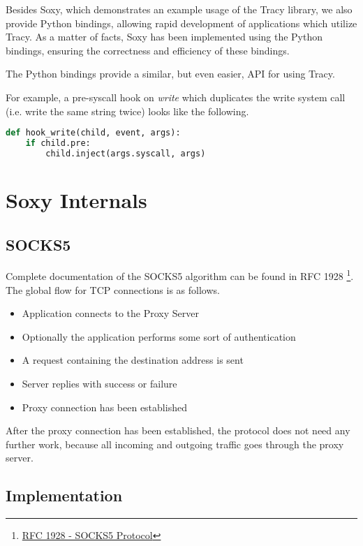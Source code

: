 \documentclass[a4paper, 10pt]{report}
\begin{document}
Besides Soxy, which demonstrates an example usage of the Tracy library, we
also provide Python bindings, allowing rapid development of applications
which utilize Tracy. As a matter of facts, Soxy has been implemented using the
Python bindings, ensuring the correctness and efficiency of these bindings.

The Python bindings provide a similar, but even easier, API for using Tracy.

For example, a pre-syscall hook on \textit{write} which duplicates the write
system call (i.e. write the same string twice) looks like the following.

\begin{lstlisting}[language=Python]
def hook_write(child, event, args):
    if child.pre:
        child.inject(args.syscall, args)
\end{lstlisting}

\section{Soxy Internals}

\subsection{SOCKS5}

Complete documentation of the SOCKS5 algorithm can be found in
RFC 1928 \footnote{\href{http://www.ietf.org/rfc/rfc1928.txt}
{RFC 1928 - SOCKS5 Protocol}}. The global flow for TCP connections
is as follows.

\begin{itemize}
\item Application connects to the Proxy Server
\item Optionally the application performs some sort of authentication
\item A request containing the destination address is sent
\item Server replies with success or failure
\item Proxy connection has been established
\end{itemize}

After the proxy connection has been established, the protocol does not need
any further work, because all incoming and outgoing traffic goes through the
proxy server.

\subsection{Implementation}
\end{document}
